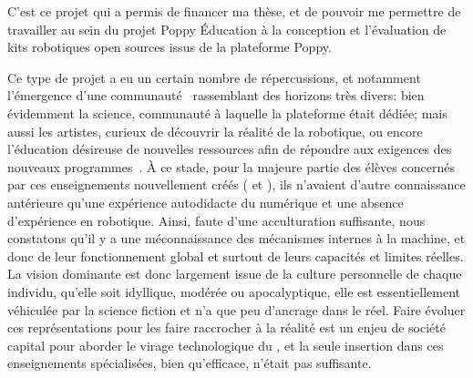     C'est ce projet qui a permis de financer ma thèse, et de pouvoir me permettre de travailler au sein du projet Poppy Éducation à la conception et l'évaluation de kits robotiques open sources issus de la plateforme Poppy.\par%
    Ce type de projet  a eu un certain nombre de répercussions, et notamment l'émergence d'une communauté~ rassemblant des horizons très divers: bien évidemment la science, communauté à laquelle la plateforme était dédiée; mais aussi les artistes, curieux de découvrir la réalité de la robotique, ou encore l'éducation désireuse de nouvelles ressources afin de répondre aux exigences des nouveaux programmes~.
    À ce stade, pour la majeure partie des élèves concernés par ces enseignements nouvellement créés ( et ), ils n'avaient d'autre connaissance antérieure qu'une expérience autodidacte du numérique et une absence d'expérience en robotique. Ainsi, faute d'une acculturation suffisante, nous constatons qu'il y a une méconnaissance des mécanismes internes à la machine, et donc de leur fonctionnement global et surtout de leurs capacités et limites réelles. La vision dominante est donc largement issue de la culture personnelle de chaque individu, qu'elle soit idyllique, modérée ou apocalyptique, elle est essentiellement véhiculée par la science fiction et n'a que peu d'ancrage dans le réel. Faire évoluer ces représentations pour les faire raccrocher à la réalité est un enjeu de société capital pour aborder le virage technologique du , et la seule insertion dans ces enseignements spécialisées, bien qu'efficace, n'était pas suffisante.
